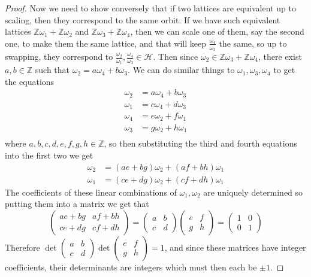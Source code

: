 \documentclass{article}
\theoremstyle{definition}
\theoremstyle{definition}
\theoremstyle{definition}
\newcommand{\Z}{\mathbb{Z}}
\newcommand{\Mabcd}{\begin{pmatrix} a&b\\c&d \end{pmatrix}}
\begin{document}
\begin{proof}
Now we need to show conversely that if two lattices are equivalent up to scaling, then they correspond to the same orbit. If we have such equivalent lattices $\Z\omega_1+\Z\omega_2$ and $\Z\omega_3+\Z\omega_4$, then we can scale one of them, say the second one, to make them the same lattice, and that will keep $\frac{\omega_4}{\omega_3}$ the same, so up to swapping, they correspond to $\frac{\omega_2}{\omega_1},\frac{\omega_4}{\omega_3}\in\mathcal H$. Then since $\omega_2\in\Z\omega_3+\Z\omega_4$, there exist $a,b\in\Z$ such that $\omega_2=a\omega_4+b\omega_3$. We can do similar things to $\omega_1,\omega_3,\omega_4$ to get the equations
\begin{align*}
    \omega_2&=a\omega_4+b\omega_3\\
    \omega_1&=c\omega_4+d\omega_3\\
    \omega_4&=e\omega_2+f\omega_1\\
    \omega_3&=g\omega_2+h\omega_1\\
\end{align*}
where $a,b,c,d,e,f,g,h\in\Z$, so then substituting the third and fourth equations into the first two we get
\begin{align*}
    \omega_2&=(ae+bg)\omega_2+(af+bh)\omega_1\\
    \omega_1&=(ce+dg)\omega_2+(cf+dh)\omega_1
\end{align*}
The coefficients of these linear combinations of $\omega_1,\omega_2$ are uniquely determined so putting them into a matrix we get that
$$\begin{pmatrix}
    ae+bg&af+bh\\
    ce+dg&cf+dh
\end{pmatrix}=\Mabcd\begin{pmatrix} e&f\\g&h \end{pmatrix}=\begin{pmatrix} 1&0\\0&1 \end{pmatrix}$$
Therefore $\det\Mabcd\det\begin{pmatrix} e&f\\g&h \end{pmatrix}=1$, and since these matrices have integer coefficients, their determinants are integers which must then each be $\pm1$.


\end{proof}
\end{document}
